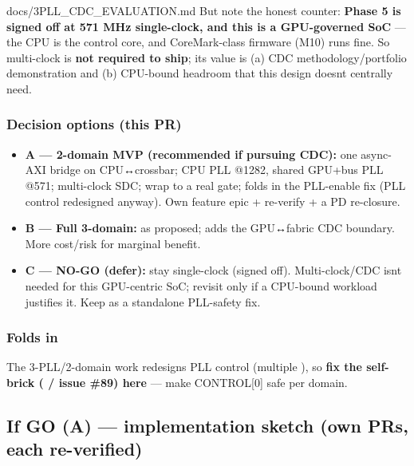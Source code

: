 \begin{relocated}{docs/3PLL_CDC_EVALUATION.md}
But note the honest counter: \textbf{Phase 5 is signed off at 571 MHz
single-clock, and this is a GPU-governed SoC} --- the CPU is the control
core, and CoreMark-class firmware (M10) runs fine. So multi-clock is
\textbf{not required to ship}; its value is (a) CDC
methodology/\allowbreak{}portfolio demonstration and (b) CPU-bound
headroom that this design doesn\textquotesingle t centrally need.

\subsubsection{Decision options (this PR)}\label{tm:dec:3pll-cdc:decision-options-this-pr}

\begin{itemize}
\tightlist
\item
  \textbf{A --- 2-domain MVP (recommended if pursuing CDC):} one
  async-AXI bridge on CPU↔crossbar; CPU PLL @1282, shared GPU+bus PLL
  @571; multi-clock SDC; wrap  to a real gate; folds in
  the  PLL-enable fix (PLL control redesigned anyway). Own
  feature epic + re-verify + a PD re-closure.
\item
  \textbf{B --- Full 3-domain:} as proposed; adds the GPU↔fabric CDC
  boundary. More cost/risk for marginal benefit.
\item
  \textbf{C --- NO-GO (defer):} stay single-clock (signed off).
  Multi-clock/\allowbreak{}CDC isn\textquotesingle t needed for this
  GPU-centric SoC; revisit only if a CPU-bound workload justifies it.
  Keep  as a standalone PLL-safety fix.
\end{itemize}

\subsubsection{Folds in}\label{tm:dec:3pll-cdc:folds-in}

The 3-PLL/\allowbreak{}2-domain work redesigns PLL control (multiple
), so \textbf{fix the  self-brick
( / issue \#89) here} --- make CONTROL{[}0{]} safe per domain.

\subsection{If GO (A) --- implementation sketch (own PRs, each
re-verified)}\label{tm:dec:3pll-cdc:6-if-go-a-implementation-sketch-own-prs-each-re-verified}


\end{relocated}
